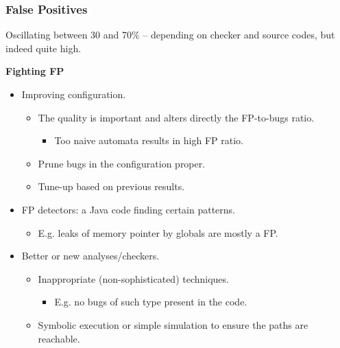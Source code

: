 \documentclass[handout,xcolor=dvipsnames]{beamer}
\newcommand{\heading}[1]{\textbf{\textcolor{BurntOrange}{#1}}}
\begin{document}
\begin{frame}[fragile]
  \frametitle{False Positives}
  Oscillating between 30 and 70\% -- depending on checker and source codes,
  but indeed quite high.

  \medskip
  \pause

  \heading {Fighting FP}
  \begin{itemize}
  \item Improving configuration.
  \begin{itemize}
    \item The quality is important and alters directly the FP-to-bugs ratio.
      \begin{itemize}
      \item Too naive automata results in high FP ratio.
      \end{itemize}
    \item Prune bugs in the configuration proper.
    \item Tune-up based on previous results.
  \end{itemize}
\pause
  \item FP detectors: a Java code finding certain patterns.
  \begin{itemize}
    \item E.g. leaks of memory pointer by globals are mostly a FP.
  \end{itemize}
\pause
  \item Better or new analyses/checkers.
  \begin{itemize}
    \item Inappropriate (non-sophisticated) techniques.
      \begin{itemize}
      \item E.g. no bugs of such type present in the code.
      \end{itemize}
    \item Symbolic execution or simple simulation to ensure the
      paths are reachable.
  \end{itemize}
  \end{itemize}

\end{frame}
\end{document}
